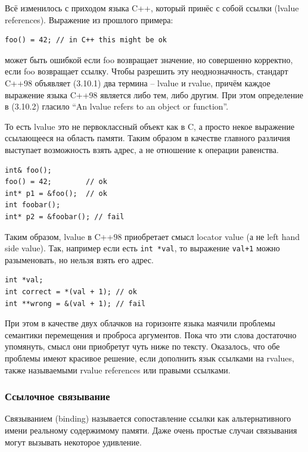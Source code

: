 \documentclass[a4paper,12pt,oneside]{article}
\begin{document}
Всё изменилось с приходом языка C++, который принёс с собой ссылки (lvalue references). Выражение из прошлого примера:

\begin{lstlisting}
foo() = 42; // in C++ this might be ok
\end{lstlisting}

может быть ошибкой если foo возвращает значение, но совершенно корректно, если foo возвращает ссылку. Чтобы разрешить эту неоднозначность, стандарт C++98 объявляет (3.10.1) два термина -- lvalue и rvalue, причём каждое выражение языка C++98 является либо тем, либо другим. При этом определение в (3.10.2) гласило ``An lvalue refers to an object or function''.

То есть lvalue это не первоклассный объект как в C, а просто некое выражение ссылающееся на область памяти. Таким образом в качестве главного различия выступает возможность взять адрес, а не отношение к операции равенства.

\begin{lstlisting}
int& foo();
foo() = 42;        // ok
int* p1 = &foo();  // ok
int foobar();
int* p2 = &foobar(); // fail
\end{lstlisting}

Таким образом, lvalue в C++98 приобретает смысл locator value (а не left hand side value). Так, например если есть \lstinline!int *val!, то выражение \lstinline!val+1! можно разыменовать, но нельзя взять его адрес.

\begin{lstlisting}
int *val;
int correct = *(val + 1); // ok
int **wrong = &(val + 1); // fail
\end{lstlisting}

При этом в качестве двух облачков на горизонте языка маячили проблемы семантики перемещения и проброса аргументов. Пока что эти слова достаточно упомянуть, смысл они приобретут чуть ниже по тексту. Оказалось, что обе проблемы имеют красивое решение, если дополнить язык ссылками на rvalues, также называемыми rvalue references или правыми ссылками.

\subsubsection{Ссылочное связывание}\label{subsub:refbinding}

Связыванием (binding) называется сопоставление ссылки как альтернативного имени реальному содержимому памяти. Даже очень простые случаи связывания могут вызывать некоторое удивление.
\end{document}
